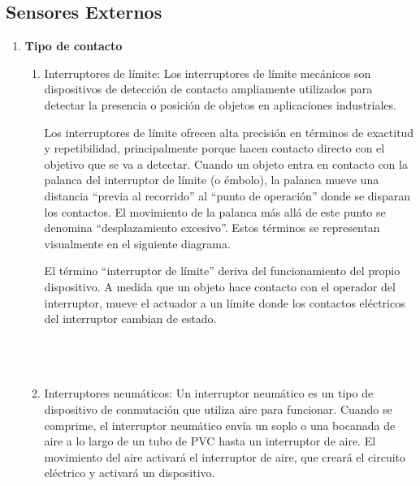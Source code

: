 	\subsection{Sensores Externos}
	 \begin{enumerate}
		\item \textbf{Tipo de contacto}
		\begin{enumerate}
			\item Interruptores de límite: Los interruptores de límite mecánicos son dispositivos de detección de contacto ampliamente utilizados para detectar la presencia o posición de objetos en aplicaciones industriales.
			
			Los interruptores de límite ofrecen alta precisión en términos de exactitud y repetibilidad, principalmente porque hacen contacto directo con el objetivo que se va a detectar.  Cuando un objeto entra en contacto con la palanca del interruptor de límite (o émbolo), la palanca mueve una distancia “previa al recorrido” al “punto de operación” donde se disparan los contactos. El movimiento de la palanca más allá de este punto se denomina “desplazamiento excesivo”.  Estos términos se representan visualmente en el siguiente diagrama.
			
			El término “interruptor de límite” deriva del funcionamiento del propio dispositivo. A medida que un objeto hace contacto con el operador del interruptor, mueve el actuador a un límite donde los contactos eléctricos del interruptor cambian de estado. \cite{InterruptoresLimite}
			\\\\\\\\
			
			\begin{figure}[h]
				\centering
				\hfill
			\end{figure}
			
			\item Interruptores neumáticos: Un interruptor neumático es un tipo de dispositivo de conmutación que utiliza aire para funcionar. Cuando se comprime, el interruptor neumático envía un soplo o una bocanada de aire a lo largo de un tubo de PVC hasta un interruptor de aire. El movimiento del aire activará el interruptor de aire, que creará el circuito eléctrico y activará un dispositivo. \cite{Neumático}
			

\end{enumerate}
\end{enumerate}

